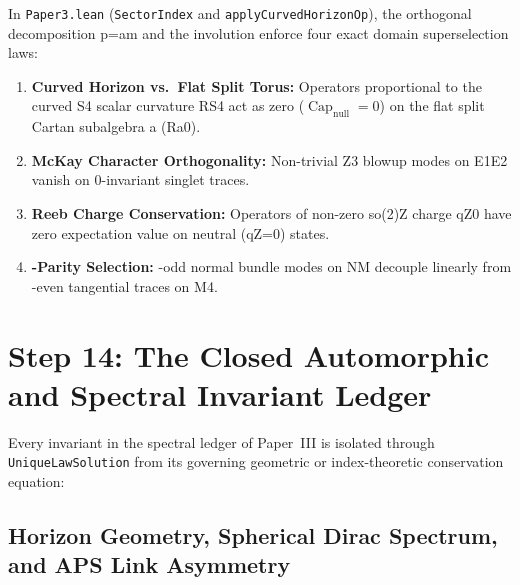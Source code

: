 \documentclass[11pt,reqno]{amsart}
\theoremstyle{definition}
\theoremstyle{remark}
\newcommand{\CapNull}{\operatorname{Cap}_{\mathrm{null}}}
\begin{document}
In \texttt{Paper3.lean} (\texttt{SectorIndex} and \texttt{applyCurvedHorizonOp}), the orthogonal decomposition p=am and the involution  enforce four exact domain superselection laws:
\begin{enumerate}[label=\textbf{Law \Roman*:}]
  \item \textbf{Curved Horizon vs.\ Flat Split Torus:} Operators proportional to the curved S4 scalar curvature RS4 act as zero ($\CapNull = 0$) on the flat split Cartan subalgebra a (Ra0).
  \item \textbf{McKay Character Orthogonality:} Non-trivial Z3 blowup modes on E1E2 vanish on 0-invariant singlet traces.
  \item \textbf{Reeb Charge Conservation:} Operators of non-zero so(2)Z charge qZ0 have zero expectation value on neutral (qZ=0) states.
  \item \textbf{-Parity Selection:} -odd normal bundle modes on NM decouple linearly from -even tangential traces on M4.
\end{enumerate}

\section{Step 14: The Closed Automorphic and Spectral Invariant Ledger}

Every invariant in the spectral ledger of Paper~III is isolated through \texttt{UniqueLawSolution} from its governing geometric or index-theoretic conservation equation:

\subsection{Horizon Geometry, Spherical Dirac Spectrum, and APS Link Asymmetry}
\end{document}
